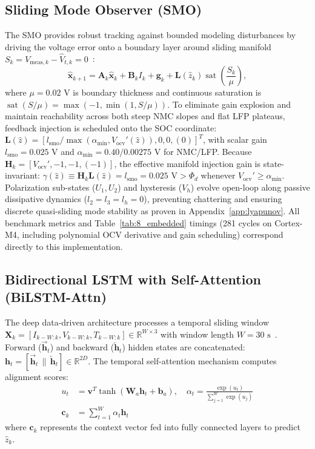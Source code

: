 \documentclass[balance,nocopyright,upint,varvw,hyphenate,barcolor=NavyBlue,nolists]{asmejour}
\begin{document}
\subsection{Sliding Mode Observer (SMO)}
The SMO provides robust tracking against bounded modeling disturbances by driving the voltage error onto a boundary layer around sliding manifold $S_k = V_{\text{meas},k} - \hat{V}_{t,k} = 0$~\cite{Kim2011,Chen2016smo}:
\begin{equation}\label{eqn:smo_state_eq}
\hat{\mathbf{x}}_{k+1} = \mathbf{A}_k \hat{\mathbf{x}}_k + \mathbf{B}_k I_k + \mathbf{g}_k + \mathbf{L}(\hat{z}_k) \operatorname{sat}\left( \frac{S_k}{\mu} \right),
\end{equation}
where $\mu = 0.02\text{ V}$ is boundary thickness and continuous saturation is $\operatorname{sat}(S/\mu) = \max(-1, \min(1, S/\mu))$. To eliminate gain explosion and maintain reachability across both steep NMC slopes and flat LFP plateaus, feedback injection is scheduled onto the SOC coordinate: $\mathbf{L}(\hat{z}) = [l_{\text{smo}}/\max(\alpha_{\min}, V_{\text{ocv}}'(\hat{z})), 0, 0, (0)]^T$, with scalar gain $l_{\text{smo}} = 0.025\text{ V}$ and $\alpha_{\min} = 0.40/0.00275\text{ V}$ for NMC/LFP. Because $\mathbf{H}_k = [V_{\text{ocv}}', -1, -1, (-1)]$, the effective manifold injection gain is state-invariant: $\gamma(\hat{z}) \equiv \mathbf{H}_k\mathbf{L}(\hat{z}) = l_{\text{smo}} = 0.025\text{ V} > \Phi_d$ whenever $V_{\text{ocv}}' \ge \alpha_{\min}$. Polarization sub-states ($U_1, U_2$) and hysteresis ($V_h$) evolve open-loop along passive dissipative dynamics ($l_2 = l_3 = l_h = 0$), preventing chattering and ensuring discrete quasi-sliding mode stability as proven in Appendix~\ref{app:lyapunov}. All benchmark metrics and Table~\ref{tab:8_embedded} timings (281 cycles on Cortex-M4, including polynomial OCV derivative and gain scheduling) correspond directly to this implementation.

\subsection{Bidirectional LSTM with Self-Attention (BiLSTM-Attn)}
The deep data-driven architecture processes a temporal sliding window $\mathbf{X}_k = [I_{k-W:k}, V_{k-W:k}, T_{k-W:k}] \in \mathbb{R}^{W \times 3}$ with window length $W = 30\text{ s}$~\cite{Song2019bilstm,Vaswani2017attention}. Forward ($\overrightarrow{\mathbf{h}}_t$) and backward ($\overleftarrow{\mathbf{h}}_t$) hidden states are concatenated: $\mathbf{h}_t = [\overrightarrow{\mathbf{h}}_t \,\|\, \overleftarrow{\mathbf{h}}_t] \in \mathbb{R}^{2 D}$. The temporal self-attention mechanism computes alignment scores:
\begin{align}
u_t &= \mathbf{v}^T \tanh(\mathbf{W}_a \mathbf{h}_t + \mathbf{b}_a), \quad \alpha_t = \frac{\exp(u_t)}{\sum_{j=1}^W \exp(u_j)} \label{eqn:attn_weight}\\
\mathbf{c}_k &= \sum_{t=1}^W \alpha_t \mathbf{h}_t \label{eqn:attn_context}
\end{align}
where $\mathbf{c}_k$ represents the context vector fed into fully connected layers to predict $\hat{z}_k$.
\end{document}
